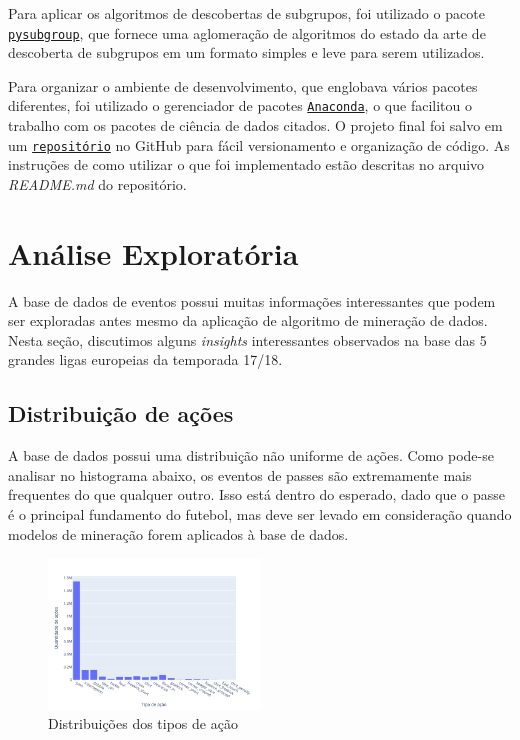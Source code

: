 \documentclass{article}
\begin{document}
Para aplicar os algoritmos de descobertas de subgrupos, foi utilizado o pacote
\href{https://pysubgroup.readthedocs.io/en/latest/}{\texttt{pysubgroup}}, que
fornece uma aglomeração de algoritmos do estado da arte de descoberta de
subgrupos em um formato simples e leve para serem utilizados.


Para organizar o ambiente de desenvolvimento, que englobava vários pacotes
diferentes, foi utilizado o gerenciador de pacotes
\href{https://www.anaconda.com/}{\texttt{Anaconda}}, o que facilitou o trabalho
com os pacotes de ciência de dados citados. O projeto final foi salvo em um
\href{https://github.com/lframosferreira/projeto-ad}{\texttt{repositório}}
no GitHub para fácil versionamento e organização de código. As instruções de
como
utilizar o que foi implementado estão descritas no arquivo \textit{README.md}
do repositório.

\section{Análise Exploratória}

A base de dados de eventos possui muitas informações interessantes que podem
ser exploradas antes mesmo da aplicação
de algoritmo de mineração de dados. Nesta seção, discutimos alguns
\textit{insights} interessantes observados na base das 5 grandes ligas
europeias da temporada 17/18.

\subsection{Distribuição de ações}

A base de dados possui uma distribuição não uniforme de ações. Como pode-se
analisar no histograma abaixo, os eventos de passes são extremamente mais
frequentes do que qualquer outro. Isso está dentro do esperado, dado que o
passe é o principal fundamento do futebol, mas deve ser levado em consideração
quando modelos de mineração forem aplicados à base de dados.

\begin{figure}[H]
    \centering
    \includegraphics[width=0.5\textwidth]{images/action_distribution.png}
    \caption{Distribuições dos tipos de ação}
    \label{fig:example}
\end{figure}
\end{document}
